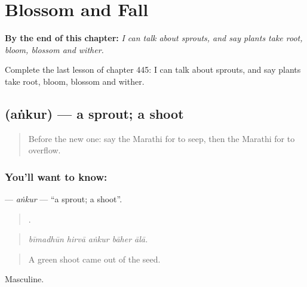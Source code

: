 
\chapter{Blossom and Fall}
\label{ch:mr-blossom-and-fall}

\begin{chapteropening}
\textbf{By the end of this chapter:} \emph{I can talk about sprouts, and say plants take root, bloom, blossom and wither.}

Complete the last lesson of chapter 445: I can talk about sprouts, and say plants take root, bloom, blossom and wither.
\end{chapteropening}

\section[\texorpdfstring{\mr{अंकुर} (aṅkur)}{अंकुर (aṅkur)}]{ (aṅkur) — a sprout; a shoot}

\label{lesson:MR-C445-ankur}



\begin{quote}
Before the new one: say the Marathi for to seep, then the Marathi for to overflow.
\end{quote}

\subsection*{You'll want to know: }
\textbf{} — \emph{aṅkur} — \textquotedblleft{}a sprout; a shoot\textquotedblright{}.

\begin{quote}
    .
\end{quote}

\begin{quote}
\emph{bīmadhūn hirvā aṅkur bāher ālā.}
\end{quote}

\begin{quote}
A green shoot came out of the seed.
\end{quote}

Masculine.

